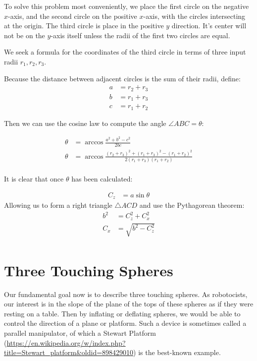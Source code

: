 \documentclass{article}
\begin{document}
To solve this problem most conveniently, we place the first circle on the negative $x$-axis, and the second circle
on the positive $x$-axis, with the circles intersecting at the origin.
The third circle is place in the positive $y$ direction. It's center will not be on the $y$-axis itself unless the
radii of the first two circles are equal.

We seek a formula for the coordinates of the third circle in terms of three input radii $r_1,r_2,r_3$.

Because the distance between adjacent circles is the sum of their radii, define:
\begin{align}
a  &= r_2 + r_3 \\
b  &= r_1 + r_3 \\
c  &= r_1 + r_2
\end{align}

Then we can use the cosine law to compute the angle $\angle ABC = \theta$:


\begin{align}
  \theta  &= \arccos{\frac{a^2 + b^2 - c^2}{2bc}} \\
  \theta  &= \arccos{\frac{(r_2+r_3)^2 + (r_1+r_3)^2 - (r_1+r_2)^2}{2(r_1+r_3)(r_1+r_2)}} \\
\end{align}

It is clear that once $\theta$ has been calculated:

\begin{align}
 C_z  &= a\sin{\theta}
\end{align}
Allowing us to form a right triangle $\triangle ACD$ and use the Pythagorean theorem:
\begin{align}
  b^2  &= C_z^2 + C_x^2 \\
  C_x   &= \sqrt{b^2 - C_z^2}  \\
\end{align}




\section{Three Touching Spheres}


Our fundamental goal now is to describe three touching spheres. As robotocists,
our interest is in the slope of the plane of the tops of these spheres
as if they were resting on a table. Then by inflating or deflating spheres,
we would be able to control the direction of a plane or platform.
Such a device is sometimes called a parallel manipulator, of which a
Stewart Platform\cite{wiki:stewart} (\url{https://en.wikipedia.org/w/index.php?title=Stewart_platform&oldid=898429010})
is the best-known example.
\end{document}
